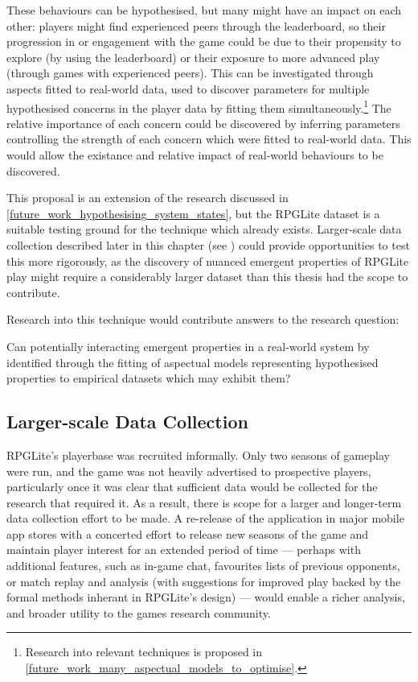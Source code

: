 These behaviours can be hypothesised, but many might have an impact on each
other: players might find experienced peers through the leaderboard, so their
progression in or engagement with the game could be due to their propensity to
explore (by using the leaderboard) or their exposure to more advanced play
(through games with experienced peers). This can be investigated through aspects
fitted to real-world data, used to discover parameters for multiple hypothesised
concerns in the player data by fitting them simultaneously.\footnote{Research into
relevant techniques is proposed in
\cref{future_work_many_aspectual_models_to_optimise}.} The relative importance
of each concern could be discovered by inferring parameters controlling the
strength of each concern which were fitted to real-world data. This would allow
the existance and relative impact of real-world behaviours to be discovered. 

This proposal is an extension of the research discussed in
\cref{future_work_hypothesising_system_states}, but the RPGLite dataset is a
suitable testing ground for the technique which already exists. Larger-scale
data collection described later in this chapter (see
\label{future_work_rpglite_large_scale_data_collection}) could provide
opportunities to test this more rigorously, as the discovery of nuanced emergent
properties of RPGLite play might require a considerably larger dataset than this
thesis had the scope to contribute.

Research into this technique would contribute answers to the research question:

\begin{researchquestion}
    Can potentially interacting emergent properties in a real-world system by
    identified through the fitting of aspectual models representing hypothesised
    properties to empirical datasets which may exhibit them?
\end{researchquestion}

    

\subsection{Larger-scale Data
Collection}
\label{future_work_rpglite_large_scale_data_collection}

RPGLite's playerbase was recruited informally. Only two seasons of gameplay were
run, and the game was not heavily advertised to prospective players,
particularly once it was clear that sufficient data would be collected for the
research that required it. As a result, there is scope for a larger and
longer-term data collection effort to be made. A re-release of the application
in major mobile app stores with a concerted effort to release new seasons of the
game and maintain player interest for an extended period of time --- perhaps
with additional features, such as in-game chat, favourites lists of previous
opponents, or match replay and analysis (with suggestions for improved play
backed by the formal methods inherant in RPGLite's design) --- would enable a
richer analysis, and broader utility to the games research community.

